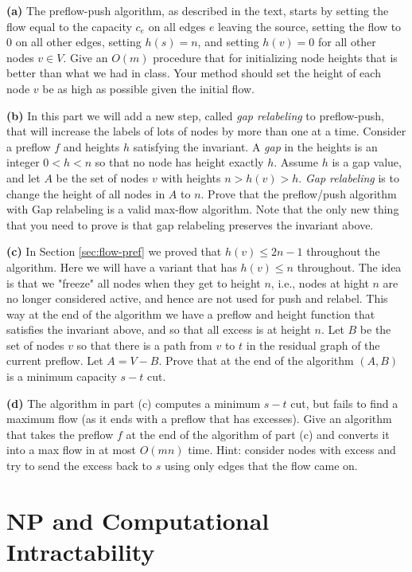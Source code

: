 \documentclass[12pt]{article}
\def\setminus{{-}}
\begin{document}
\begin{enumerate}
\medskip
{\bf (a)}
The preflow-push algorithm, as described in the text, starts by
setting the flow equal to the capacity $c_e$ 
on all edges $e$ leaving the source, setting the flow
to 0 on all other edges, setting $h(s)=n$, and setting $h(v)=0$ for all
other nodes $v \in V$. Give an $O(m)$ procedure that for initializing node
heights that is better than what we had in class. Your method should
set the height of each node $v$ be as high as possible given the initial
flow.

\medskip
{\bf (b)} In this part we will add a new step, called {\em gap relabeling}
to preflow-push, that will increase the labels of lots of nodes by more than
one at a time. Consider a preflow $f$ and heights $h$ satisfying the
invariant. A {\em gap} in the heights is an integer $0 < h< n$ so that no node
has height exactly $h$. Assume $h$ is a gap value, and let $A$ be the set of
nodes $v$ with heights $n > h(v) > h$. {\em Gap relabeling} is to change the
height of all nodes in $A$ to $n$. Prove that the preflow/push algorithm with
Gap relabeling is a valid max-flow algorithm. Note that the only new thing
that you need to prove is that gap relabeling preserves the invariant above.

\medskip
{\bf (c)} In Section \ref{sec:flow-pref} we proved that $h(v) \le 2n -1$ 
throughout the algorithm.  Here we will have a variant that has $h(v) \le n$ 
throughout. The idea is that we "freeze" all nodes when they get to height 
$n$, i.e., nodes at hight
$n$ are no longer considered active, and hence are not used for push and
relabel. This way at the end of the algorithm we have a preflow and height
function that satisfies the invariant above, and so that all excess is at
height $n$. Let $B$ be the set of nodes $v$ so that there is a path from
$v$ to $t$ in the residual graph of the current preflow. Let
$A=V \setminus B$. Prove that at the end of the algorithm $(A,B)$ is a minimum
capacity $s-t$ cut.

\medskip
{\bf (d)} The algorithm in part (c) computes a minimum $s-t$ cut, but fails to 
find a maximum flow (as it ends with a preflow that has excesses). Give an 
algorithm that takes the preflow $f$ at the end of the algorithm of part (c) 
and converts it into a max flow in at most $O(mn)$ time. Hint: consider nodes 
with excess and try to send the excess back to $s$ using only edges that the 
flow came on.


\end{enumerate}

\section{NP and Computational Intractability}
\end{document}
